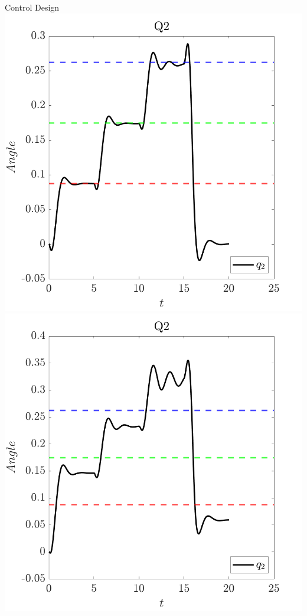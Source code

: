 \documentclass[12pt]{article}
\begin{document}
\begin{section}{Control Design}
\centering
\includegraphics[scale=0.60]{q2_vs_t_no_disturb.png}
\includegraphics[scale=0.60]{q2_vs_t_disturb.png}
\end{section}
\end{document}
